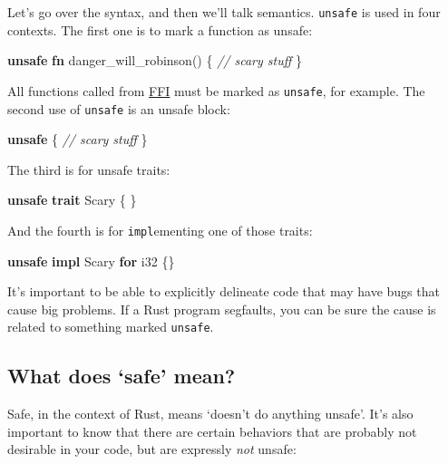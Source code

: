 \documentclass[a4paper,]{book}
\newenvironment{Shaded}{\begin{snugshade}}{\end{snugshade}}
\newcommand{\KeywordTok}[1]{\textcolor[rgb]{0.13,0.29,0.53}{\textbf{{#1}}}}
\newcommand{\DataTypeTok}[1]{\textcolor[rgb]{0.13,0.29,0.53}{{#1}}}
\newcommand{\CommentTok}[1]{\textcolor[rgb]{0.56,0.35,0.01}{\textit{{#1}}}}
\newcommand{\NormalTok}[1]{{#1}}
\begin{document}
Let's go over the syntax, and then we'll talk semantics. \texttt{unsafe}
is used in four contexts. The first one is to mark a function as unsafe:

\begin{Shaded}
\begin{Highlighting}[]
\KeywordTok{unsafe} \KeywordTok{fn} \NormalTok{danger_will_robinson() \{}
    \CommentTok{// scary stuff}
\NormalTok{\}}
\end{Highlighting}
\end{Shaded}

All functions called from \protect\hyperlink{sec--ffi}{FFI} must be
marked as \texttt{unsafe}, for example. The second use of
\texttt{unsafe} is an unsafe block:

\begin{Shaded}
\begin{Highlighting}[]
\KeywordTok{unsafe} \NormalTok{\{}
    \CommentTok{// scary stuff}
\NormalTok{\}}
\end{Highlighting}
\end{Shaded}

The third is for unsafe traits:

\begin{Shaded}
\begin{Highlighting}[]
\KeywordTok{unsafe} \KeywordTok{trait} \NormalTok{Scary \{ \}}
\end{Highlighting}
\end{Shaded}

And the fourth is for \texttt{impl}ementing one of those traits:

\begin{Shaded}
\begin{Highlighting}[]
\KeywordTok{unsafe} \KeywordTok{impl} \NormalTok{Scary }\KeywordTok{for} \DataTypeTok{i32} \NormalTok{\{\}}
\end{Highlighting}
\end{Shaded}

It's important to be able to explicitly delineate code that may have
bugs that cause big problems. If a Rust program segfaults, you can be
sure the cause is related to something marked \texttt{unsafe}.

\subsection{\texorpdfstring{What does `safe'
mean?}{What does safe mean?}}\label{what-does-safe-mean}

Safe, in the context of Rust, means `doesn't do anything unsafe'. It's
also important to know that there are certain behaviors that are
probably not desirable in your code, but are expressly \emph{not}
unsafe:
\end{document}
